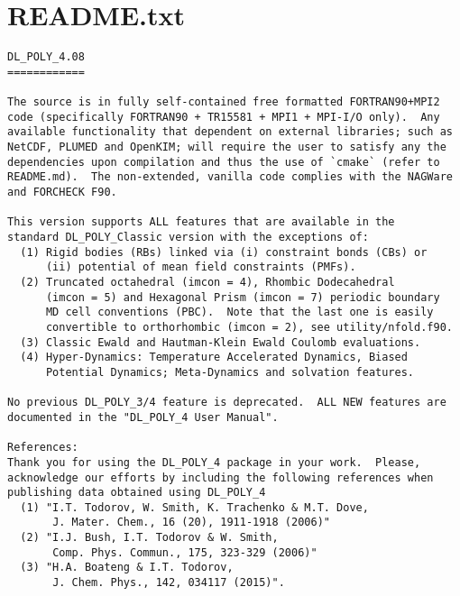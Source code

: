 \label{readme}
\section{README.txt}
\begin{verbatim}
DL_POLY_4.08
============

The source is in fully self-contained free formatted FORTRAN90+MPI2
code (specifically FORTRAN90 + TR15581 + MPI1 + MPI-I/O only).  Any
available functionality that dependent on external libraries; such as
NetCDF, PLUMED and OpenKIM; will require the user to satisfy any the
dependencies upon compilation and thus the use of `cmake` (refer to
README.md).  The non-extended, vanilla code complies with the NAGWare
and FORCHECK F90.

This version supports ALL features that are available in the
standard DL_POLY_Classic version with the exceptions of:
  (1) Rigid bodies (RBs) linked via (i) constraint bonds (CBs) or
      (ii) potential of mean field constraints (PMFs).
  (2) Truncated octahedral (imcon = 4), Rhombic Dodecahedral
      (imcon = 5) and Hexagonal Prism (imcon = 7) periodic boundary
      MD cell conventions (PBC).  Note that the last one is easily
      convertible to orthorhombic (imcon = 2), see utility/nfold.f90.
  (3) Classic Ewald and Hautman-Klein Ewald Coulomb evaluations.
  (4) Hyper-Dynamics: Temperature Accelerated Dynamics, Biased
      Potential Dynamics; Meta-Dynamics and solvation features.

No previous DL_POLY_3/4 feature is deprecated.  ALL NEW features are
documented in the "DL_POLY_4 User Manual".

References:
Thank you for using the DL_POLY_4 package in your work.  Please,
acknowledge our efforts by including the following references when
publishing data obtained using DL_POLY_4
  (1) "I.T. Todorov, W. Smith, K. Trachenko & M.T. Dove,
       J. Mater. Chem., 16 (20), 1911-1918 (2006)"
  (2) "I.J. Bush, I.T. Todorov & W. Smith,
       Comp. Phys. Commun., 175, 323-329 (2006)"
  (3) "H.A. Boateng & I.T. Todorov,
       J. Chem. Phys., 142, 034117 (2015)".


\end{verbatim}

